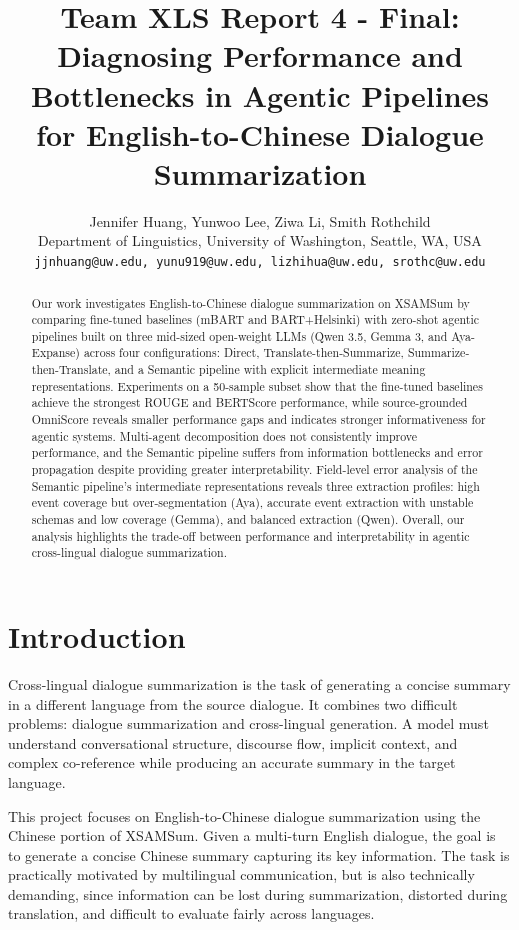 \documentclass[11pt]{article}
\title{Team XLS Report 4 - Final: Diagnosing Performance and Bottlenecks in Agentic Pipelines for English-to-Chinese Dialogue Summarization}
\author{
Jennifer Huang, Yunwoo Lee, Ziwa Li, Smith Rothchild \\
Department of Linguistics, University of Washington, Seattle, WA, USA \\
\texttt{jjnhuang@uw.edu, yunu919@uw.edu, lizhihua@uw.edu, srothc@uw.edu}
}
\begin{document}
\maketitle
\begin{abstract}
Our work investigates English-to-Chinese dialogue summarization on XSAMSum by comparing fine-tuned baselines (mBART and BART+Helsinki) with zero-shot agentic pipelines built on three mid-sized open-weight LLMs (Qwen 3.5, Gemma 3, and Aya-Expanse) across four configurations: Direct, Translate-then-Summarize, Summarize-then-Translate, and a Semantic pipeline with explicit intermediate meaning representations. Experiments on a 50-sample subset show that the fine-tuned baselines achieve the strongest ROUGE and BERTScore performance, while source-grounded OmniScore reveals smaller performance gaps and indicates stronger informativeness for agentic systems. Multi-agent decomposition does not consistently improve performance, and the Semantic pipeline suffers from information bottlenecks and error propagation despite providing greater interpretability. Field-level error analysis of the Semantic pipeline's intermediate representations reveals three extraction profiles: high event coverage but over-segmentation (Aya), accurate event extraction with unstable schemas and low coverage (Gemma), and balanced extraction (Qwen). Overall, our analysis highlights the trade-off between performance and interpretability in agentic cross-lingual dialogue summarization.
\end{abstract}

\section{Introduction}

Cross-lingual dialogue summarization is the task of generating a concise summary in a different language from the source dialogue. It combines two difficult problems: dialogue summarization and cross-lingual generation. A model must understand conversational structure, discourse flow, implicit context, and complex co-reference while producing an accurate summary in the target language.

This project focuses on English-to-Chinese dialogue summarization using the Chinese portion of XSAMSum. Given a multi-turn English dialogue, the goal is to generate a concise Chinese summary capturing its key information. The task is practically motivated by multilingual communication, but is also technically demanding, since information can be lost during summarization, distorted during translation, and difficult to evaluate fairly across languages.
\end{document}

